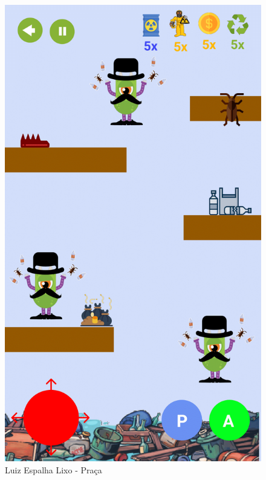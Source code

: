 \documentclass[]{scrartcl}
\begin{document}
\begin{figure}[H]
	\begin{center}
		\includegraphics[scale=0.3]{figs/Game Design-16.png}
		\caption{Luiz Espalha Lixo - Praça}
	\end{center}
\end{figure}
\end{document}
